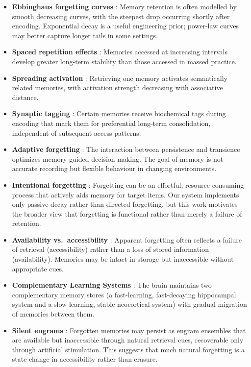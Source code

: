 \documentclass[11pt,a4paper]{article}
\begin{document}
\begin{itemize}
    \item \textbf{Ebbinghaus forgetting curves} \citep{ebbinghaus1885, murre2015replication}: Memory retention is often modelled by smooth decreasing curves, with the steepest drop occurring shortly after encoding. Exponential decay is a useful engineering prior; power-law curves may better capture longer tails in some settings.
    \item \textbf{Spaced repetition effects} \citep{cepeda2006distributed}: Memories accessed at increasing intervals develop greater long-term stability than those accessed in massed practice.
    \item \textbf{Spreading activation} \citep{collins1975spreading}: Retrieving one memory activates semantically related memories, with activation strength decreasing with associative distance.
    \item \textbf{Synaptic tagging} \citep{frey1997synaptic}: Certain memories receive biochemical tags during encoding that mark them for preferential long-term consolidation, independent of subsequent access patterns.
    \item \textbf{Adaptive forgetting} \citep{richards2017persistence}: The interaction between persistence and transience optimizes memory-guided decision-making. The goal of memory is not accurate recording but flexible behaviour in changing environments.
    \item \textbf{Intentional forgetting} \citep{popov2019forgetting}: Forgetting can be an effortful, resource-consuming process that actively aids memory for target items. Our system implements only passive decay rather than directed forgetting, but this work motivates the broader view that forgetting is functional rather than merely a failure of retention.
    \item \textbf{Availability vs.\ accessibility} \citep{tulving1966availability}: Apparent forgetting often reflects a failure of retrieval (accessibility) rather than a loss of stored information (availability). Memories may be intact in storage but inaccessible without appropriate cues.
    \item \textbf{Complementary Learning Systems} \citep{mcclelland1995complementary}: The brain maintains two complementary memory stores (a fast-learning, fast-decaying hippocampal system and a slow-learning, stable neocortical system) with gradual migration of memories between them.
    \item \textbf{Silent engrams} \citep{ryan2022forgetting}: Forgotten memories may persist as engram ensembles that are available but inaccessible through natural retrieval cues, recoverable only through artificial stimulation. This suggests that much natural forgetting is a state change in accessibility rather than erasure.
\end{itemize}
\end{document}
